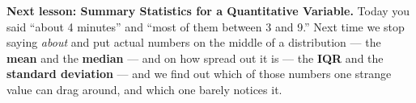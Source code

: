 \documentclass[12pt]{article}
\begin{document}
\vspace{0.12in}

\boxguard[10]
\begin{spiralbox}
\small
\textbf{Next lesson: Summary Statistics for a Quantitative Variable.} Today you said ``about
4 minutes'' and ``most of them between 3 and 9.'' Next time we stop saying \emph{about} and put
actual numbers on the middle of a distribution --- the \textbf{mean} and the \textbf{median} ---
and on how spread out it is --- the \textbf{IQR} and the \textbf{standard deviation} --- and we
find out which of those numbers one strange value can drag around, and which one barely notices
it.
\end{spiralbox}
\end{document}
